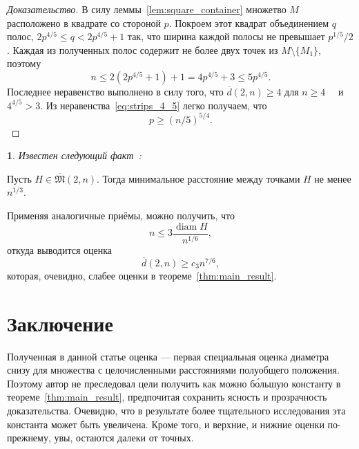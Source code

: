 \documentclass[11pt,twoside,draft
]{article}
\newtheorem{Remark}{\indent {\sc Remark}}
\begin{document}
\begin{proof}[Доказательство]
	В силу леммы~\ref{lem:square_container} множетво $M$ расположено в квадрате со стороной $p$.
	Покроем этот квадрат объединением $q$ полос, $2p^{4/5} \leq q < 2p^{4/5} + 1$ так,
	что ширина каждой полосы не превышает $p^{1/5} / 2$.
	Каждая из полученных полос содержит не более двух точек из  $M\setminus\{M_1\}$,
	поэтому
	\begin{equation}
		\label{eq:strips_4_5}
		n \leq 2(2p^{4/5} + 1) + 1
		= 4p^{4/5}+3
		\leq 5 p^{4/5}
		.
	\end{equation}
	Последнее неравенство выполнено в силу того, что $\overline{d}(2,n) \geq 4$ для $n\geq 4$~~\cite{kurz2008minimum}
	и $4^{4/5}>3$.
	Из неравенства~\eqref{eq:strips_4_5} легко получаем, что
	\begin{equation}
		\label{eq:strips_5_4}
		p \geq (n/5) ^ {5/4}
		.
	\end{equation}
\end{proof}



\begin{Remark}
	Известен следующий факт~\cite[Следствие 1]{solymosi2003note}:
\end{Remark}

\begin{lemma}
	Пусть $H \in \overline {\mathfrak{M}}(2,n)$.
	Тогда минимальное расстояние между точками $H$ не менее $n^{1/3}$.
\end{lemma}
Применяя аналогичные приёмы, можно получить, что
\begin{equation}
	n \leq 3 \frac{\operatorname{diam} H }{n^{1/6}}
	,
\end{equation}
откуда выводится оценка
\begin{equation}
	\overline{d}(2,n) \geq c_3 n^{7/6}
	,
\end{equation}
которая, очевидно, слабее оценки в теореме~\ref{thm:main_result}.


\section{Заключение}
Полученная в данной статье оценка ---
первая специальная оценка диаметра снизу для множества с целочисленными расстояниями полуобщего положения.
Поэтому автор не преследовал цели получить как можно б\'{о}льшую константу в теореме~\ref{thm:main_result},
предпочитая сохранить ясность и прозрачность доказательства.
Очевидно, что в результате более тщательного исследования эта константа может быть увеличена.
Кроме того, и верхние, и нижние оценки по-прежнему, увы, остаются далеки от точных.
\end{document}

